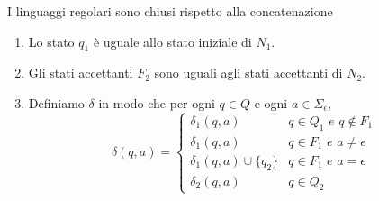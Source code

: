 \begin{Thm}{I linguaggi regolari sono chiusi rispetto alla concatenazione}{}
\begin{demonstration}
\begin{enumerate}
    Gli stati di $N$ sono tutti gli stati di $N_{1}$ ed $N_{2}$.
    \item Lo stato $q_{1}$ è uguale allo stato iniziale di $N_{1}$.
    \item Gli stati accettanti $F_{2}$ sono uguali agli stati accettanti di $N_{2}$.
    \item Definiamo $\delta$ in modo che per ogni $q \in Q$ e ogni $a \in \Sigma_{\epsilon}$,
    \begin{equation*}
    \delta(q,a)=\begin{cases}
        \delta_1(q,a)&q\in Q_1 \textit{ e }q \notin F_1\\ \delta_1(q,a)&q \in F_1\textit{ e }a \neq\epsilon\\ \delta_1(q,a)\cup\{q_2\}& q \in F_{1} \textit{ e }a = \epsilon \\ \delta_2(q,a)&q \in Q_2
    \end{cases}
    \end{equation*}
\end{enumerate}
\end{demonstration}
\end{Thm}


